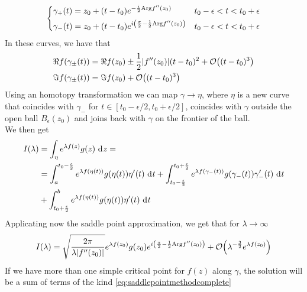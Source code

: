 \documentclass[../qm.tex]{subfiles}
\begin{document}
	\begin{equation}
		\begin{dcases}
			\gamma_+(t)=z_0+(t-t_0)e^{-\frac{i}{2}\mathrm{Arg}f''(z_0)}&t_0-\epsilon<t<t_0+\epsilon\\
			\gamma_-(t)=z_0+(t-t_0)e^{i\left( \frac{\pi}{2}-\frac{1}{2}\mathrm{Arg}f''(z_0) \right)}&t_0-\epsilon<t<t_0+\epsilon
		\end{dcases}
		\label{eq:steepestcurves}
	\end{equation}
	In these curves, we have that
	\begin{equation*}
		\begin{aligned}
			\real{f(\gamma_{\pm}(t))}&=\real{f(z_0)}\pm\frac{1}{2}\abs{f''(z_0)}(t-t_0)^2+\order{(t-t_0)^3}\\
			\imaginary{f(\gamma_{\pm}(t))}&=\imaginary{f(z_0)}+\order{(t-t_0)^3}
		\end{aligned}
	\end{equation*}
	Using an homotopy transformation we can map $\gamma\to\eta$, where $\eta$ is a new curve that coincides with $\gamma_-$ for $t\in[t_0-\epsilon/2,t_0+\epsilon/2]$, coincides with $\gamma$ outside the open ball $B_\epsilon(z_0)$ and joins back with $\gamma$ on the frontier of the ball.\\
	We then get
	\begin{equation}
		\begin{aligned}
			I(\lambda)&=\int_{\eta}e^{\lambda f(z)}g(z)\ \mathrm{d}^{}z=\\
			&=\int_{a}^{t_0-\frac{\epsilon}{2}}e^{\lambda f(\eta(t))}g(\eta(t))\eta'(t)\ \mathrm{d}^{}t+\int_{t_0-\frac{\epsilon}{2}}^{t_0+\frac{\epsilon}{2}}e^{\lambda f(\gamma_-(t))}g(\gamma_-(t))\gamma_-'(t)\ \mathrm{d}^{}t\\
			&+\int_{t_0+\frac{\epsilon}{2}}^{b}e^{\lambda f(\eta(t))}g(\eta(t))\eta'(t)\ \mathrm{d}^{}t
		\end{aligned}
		\label{eq:integralhomotopy}
	\end{equation}
	Applicating now the saddle point approximation, we get that for $\lambda\to\infty$
	\begin{equation}
		I(\lambda)=\sqrt{\frac{2\pi}{\lambda\abs{f''(z_0)}}}e^{\lambda f(z_0)}g(z_0)e^{i\left( \frac{\pi}{2}-\frac{1}{2}\mathrm{Arg}f''(z_0) \right)}+\order{\lambda^{-\frac{3}{2}}e^{\lambda f(z_0)}}
		\label{eq:saddlepointmethodcomplete}
	\end{equation}
	If we have more than one simple critical point for $f(z)$ along $\gamma$, the solution will be a sum of terms of the kind \eqref{eq:saddlepointmethodcomplete}
\end{document}
